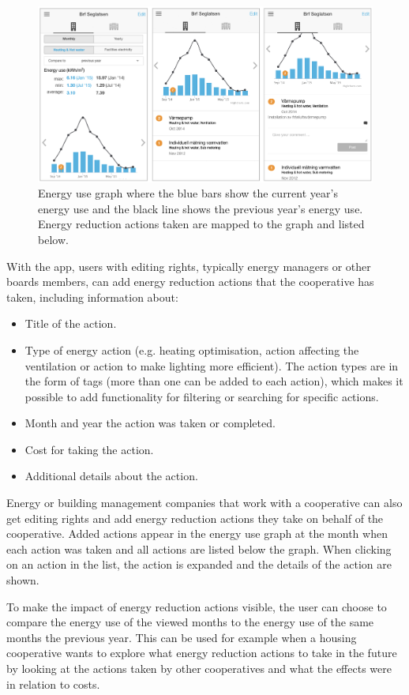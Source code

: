 \begin{figure}
	\centering
	\includegraphics[width=0.98\linewidth]{img/Figure201_Actions.png}
	\caption{Energy use graph where the blue bars show the current year's energy use and the black line shows the previous year's energy use. Energy reduction actions taken are mapped to the graph and listed below.}
	\label{fig:Figure201_Actions}
\end{figure}

With the app, users with editing rights, typically energy managers or other boards members, can  add energy reduction actions that the cooperative has taken, including information about:
\begin{itemize}
\item Title of the action.
\item Type of energy action (e.g. heating optimisation, action affecting the ventilation or action to make lighting more efficient). The action types are in the form of tags (more than one can be added to each action), which makes it possible to add functionality for filtering or searching for specific actions.
\item Month and year the action was taken or completed.
\item Cost for taking the action.
\item Additional details about the action.
\end{itemize}

Energy or building management companies that work with a cooperative can also get editing rights and add energy reduction actions they take on behalf of the cooperative. Added actions appear in the energy use graph at the month when each action was taken and all actions are listed below the graph. When clicking on an action in the list, the action is expanded and the details of the action are shown.

To make the impact of energy reduction actions visible, the user can choose to compare the energy use of the viewed months to the energy use of the same months the previous year. This can be used for example when a housing cooperative wants to explore what energy reduction actions to take in the future by looking at the actions taken by other cooperatives and what the effects were in relation to costs.

